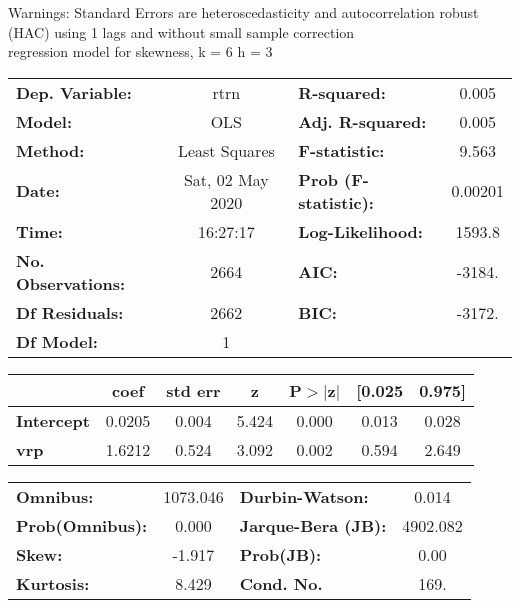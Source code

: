 Warnings: \newline
 [1] Standard Errors are heteroscedasticity and autocorrelation robust (HAC) using 1 lags and without small sample correction\\ 

regression model for skewness, k = 6 h = 3\begin{center}
\begin{tabular}{lclc}
\toprule
\textbf{Dep. Variable:}    &       rtrn       & \textbf{  R-squared:         } &     0.005   \\
\textbf{Model:}            &       OLS        & \textbf{  Adj. R-squared:    } &     0.005   \\
\textbf{Method:}           &  Least Squares   & \textbf{  F-statistic:       } &     9.563   \\
\textbf{Date:}             & Sat, 02 May 2020 & \textbf{  Prob (F-statistic):} &  0.00201    \\
\textbf{Time:}             &     16:27:17     & \textbf{  Log-Likelihood:    } &    1593.8   \\
\textbf{No. Observations:} &        2664      & \textbf{  AIC:               } &    -3184.   \\
\textbf{Df Residuals:}     &        2662      & \textbf{  BIC:               } &    -3172.   \\
\textbf{Df Model:}         &           1      & \textbf{                     } &             \\
\bottomrule
\end{tabular}
\begin{tabular}{lcccccc}
                   & \textbf{coef} & \textbf{std err} & \textbf{z} & \textbf{P$> |$z$|$} & \textbf{[0.025} & \textbf{0.975]}  \\
\midrule
\textbf{Intercept} &       0.0205  &        0.004     &     5.424  &         0.000        &        0.013    &        0.028     \\
\textbf{vrp}       &       1.6212  &        0.524     &     3.092  &         0.002        &        0.594    &        2.649     \\
\bottomrule
\end{tabular}
\begin{tabular}{lclc}
\textbf{Omnibus:}       & 1073.046 & \textbf{  Durbin-Watson:     } &    0.014  \\
\textbf{Prob(Omnibus):} &   0.000  & \textbf{  Jarque-Bera (JB):  } & 4902.082  \\
\textbf{Skew:}          &  -1.917  & \textbf{  Prob(JB):          } &     0.00  \\
\textbf{Kurtosis:}      &   8.429  & \textbf{  Cond. No.          } &     169.  \\
\bottomrule
\end{tabular}
\end{center}


